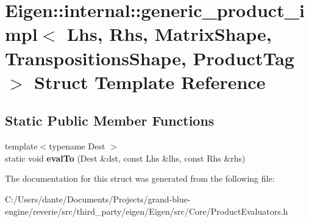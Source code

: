 \hypertarget{struct_eigen_1_1internal_1_1generic__product__impl_3_01_lhs_00_01_rhs_00_01_matrix_shape_00_01_tf888e33b0f360ba10ea614ccb9c9fdb1}{}\section{Eigen\+::internal\+::generic\+\_\+product\+\_\+impl$<$ Lhs, Rhs, Matrix\+Shape, Transpositions\+Shape, Product\+Tag $>$ Struct Template Reference}
\label{struct_eigen_1_1internal_1_1generic__product__impl_3_01_lhs_00_01_rhs_00_01_matrix_shape_00_01_tf888e33b0f360ba10ea614ccb9c9fdb1}
\subsection*{Static Public Member Functions}
\begin{DoxyCompactItemize}
\item 
\mbox{\label{struct_eigen_1_1internal_1_1generic__product__impl_3_01_lhs_00_01_rhs_00_01_matrix_shape_00_01_tf888e33b0f360ba10ea614ccb9c9fdb1_a8ab4d110bcc31d324db2496a372e4661}} 
{\footnotesize template$<$typename Dest $>$ }\\static void {\bfseries eval\+To} (Dest \&dst, const Lhs \&lhs, const Rhs \&rhs)
\end{DoxyCompactItemize}


The documentation for this struct was generated from the following file\+:\begin{DoxyCompactItemize}
\item 
C\+:/\+Users/dante/\+Documents/\+Projects/grand-\/blue-\/engine/reverie/src/third\+\_\+party/eigen/\+Eigen/src/\+Core/Product\+Evaluators.\+h\end{DoxyCompactItemize}
